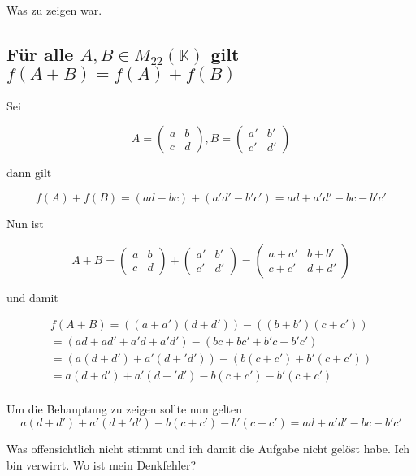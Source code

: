 \documentclass{article}
\begin{document}
Was zu zeigen war.

\subsection*{Für alle \(A, B\in M_{22}(\mathbb{K})\) gilt \(f(A+B) = f(A) + f(B)\)}

Sei

\[
A=
  \begin{pmatrix}
    a & b \\
    c & d
  \end{pmatrix}
,
B=
  \begin{pmatrix}
    a' & b' \\
    c' & d'
  \end{pmatrix}
\]

dann gilt

\[
f(A)+f(B) = (ad - bc) + (a'd' - b'c')
          = ad + a'd' - bc - b'c'
\]

Nun ist

\[
A+B=
  \begin{pmatrix}
    a & b \\
    c & d
  \end{pmatrix}
  +
  \begin{pmatrix}
    a' & b' \\
    c' & d'
  \end{pmatrix}
  =
  \begin{pmatrix}
    a+a' & b+b' \\
    c+c' & d+d'
  \end{pmatrix}
\]

und damit

\[
\begin{split}
f(A+B)= ((a+a')(d+d'))-((b+b')(c+c')) \\
      = (ad+ad'+a'd+a'd')-(bc+bc'+b'c+b'c') \\
      = (a(d+d')+a'(d+'d'))-(b(c+c')+b'(c+c')) \\
      = a(d+d')+a'(d+'d')-b(c+c')-b'(c+c') \\
\end{split}
\]

Um die Behauptung zu zeigen sollte nun gelten
\[
a(d+d')+a'(d+'d')-b(c+c')-b'(c+c') = ad + a'd' - bc - b'c'
\]

Was offensichtlich nicht stimmt und ich damit die Aufgabe nicht gelöst habe. Ich bin verwirrt. Wo ist mein Denkfehler?
\end{document}
